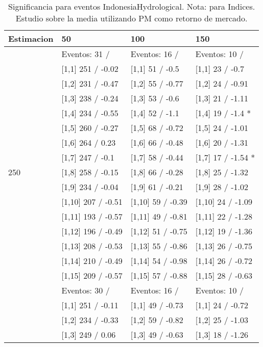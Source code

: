 \begin{table}

\caption{Significancia para eventos IndonesiaHydrological. Nota: para Indices. Estudio sobre la media utilizando PM como retorno de mercado.}
\centering
\begin{tabular}[t]{llll}
\toprule
Estimacion & 50 & 100 & 150\\
\midrule
 & Eventos:  31 / & Eventos:  16 / & Eventos:  10 /\\
 & {}[1,1] 251  / -0.02 & {}[1,1] 51  / -0.5 & {}[1,1] 23  / -0.7\\
 & {}[1,2] 231  / -0.47 & {}[1,2] 55  / -0.77 & {}[1,2] 24  / -0.91\\
 & {}[1,3] 238  / -0.24 & {}[1,3] 53  / -0.6 & {}[1,3] 21  / -1.11\\
 & {}[1,4] 234  / -0.55 & {}[1,4] 52  / -1.1 & {}[1,4] 19  / -1.4 *\\
\addlinespace
 & {}[1,5] 260  / -0.27 & {}[1,5] 68  / -0.72 & {}[1,5] 24  / -1.01\\
 & {}[1,6] 264  / 0.23 & {}[1,6] 66  / -0.48 & {}[1,6] 20  / -1.31\\
 & {}[1,7] 247  / -0.1 & {}[1,7] 58  / -0.44 & {}[1,7] 17  / -1.54 *\\
250 & {}[1,8] 258  / -0.15 & {}[1,8] 66  / -0.28 & {}[1,8] 25  / -1.32\\
 & {}[1,9] 234  / -0.04 & {}[1,9] 61  / -0.21 & {}[1,9] 28  / -1.02\\
\addlinespace
 & {}[1,10] 207  / -0.51 & {}[1,10] 59  / -0.39 & {}[1,10] 24  / -1.09\\
 & {}[1,11] 193  / -0.57 & {}[1,11] 49  / -0.81 & {}[1,11] 22  / -1.28\\
 & {}[1,12] 196  / -0.49 & {}[1,12] 51  / -0.75 & {}[1,12] 19  / -1.36\\
 & {}[1,13] 208  / -0.53 & {}[1,13] 55  / -0.86 & {}[1,13] 26  / -0.75\\
 & {}[1,14] 210  / -0.49 & {}[1,14] 54  / -0.98 & {}[1,14] 26  / -0.72\\
\addlinespace
 & {}[1,15] 209  / -0.57 & {}[1,15] 57  / -0.88 & {}[1,15] 28  / -0.63\\
 & Eventos:  30 / & Eventos:  16 / & Eventos:  10 /\\
 & {}[1,1] 251  / -0.11 & {}[1,1] 49  / -0.73 & {}[1,1] 24  / -0.72\\
 & {}[1,2] 234  / -0.33 & {}[1,2] 59  / -0.82 & {}[1,2] 25  / -1.03\\
 & {}[1,3] 249  / 0.06 & {}[1,3] 49  / -0.63 & {}[1,3] 18  / -1.26\\

\end{tabular}
\end{table}
